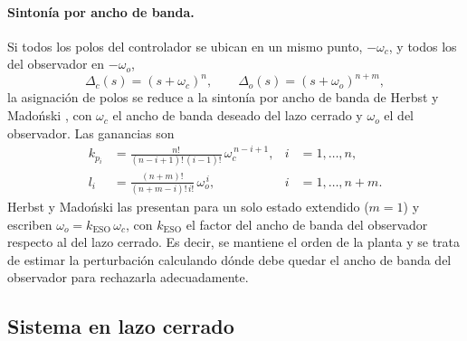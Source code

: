 \paragraph{Sintonía por ancho de banda.} Si todos los polos del controlador se
ubican en un mismo punto, $-\omega_c$, y todos los del observador en
$-\omega_o$,
\begin{equation}
\Delta_c(s) = (s + \omega_c)^{n}, \qquad \Delta_o(s) = (s + \omega_o)^{n+m},
\label{eq:sintonia_polos}
\end{equation}
la asignación de polos se reduce a la sintonía por ancho de banda de Herbst y
Madoński \cite[tabla~A.1.1]{herbst2024adrc}, con $\omega_c$ el ancho de banda
deseado del lazo cerrado y $\omega_o$ el del observador. Las ganancias son
\begin{equation}
\begin{aligned}
k_{p_i} &= \frac{n!}{(n-i+1)!\,(i-1)!}\,\omega_c^{\,n-i+1}, & i &= 1, \dots, n, \\[0.5em]
l_i &= \frac{(n+m)!}{(n+m-i)!\,i!}\,\omega_o^{\,i}, & i &= 1, \dots, n+m .
\end{aligned}
\label{eq:sintonia_l}
\end{equation}
Herbst y Madoński las presentan para un solo estado extendido ($m = 1$) y
escriben $\omega_o = k_{\mathrm{ESO}}\,\omega_c$, con $k_{\mathrm{ESO}}$ el factor
del ancho de banda del observador respecto al del lazo cerrado. Es decir, se mantiene el orden de la planta
y se trata de estimar la perturbación calculando dónde debe quedar el ancho de banda del observador
para rechazarla adecuadamente.

\subsection{Sistema en lazo cerrado}
\label{subsec:lazo_cerrado}

